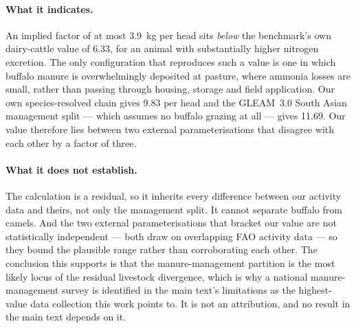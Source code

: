 \paragraph{What it indicates.} An implied factor of at most \SI{3.9}{\kilogram} per head sits
\emph{below} the benchmark's own dairy-cattle value of \SI{6.33}{}, for an animal with substantially
higher nitrogen excretion. The only configuration that reproduces such a value is one in which
buffalo manure is overwhelmingly deposited at pasture, where ammonia losses are small, rather than
passing through housing, storage and field application. Our own species-resolved chain gives
\SI{9.83}{} per head and the GLEAM~3.0 South Asian management split --- which assumes no buffalo
grazing at all --- gives \SI{11.69}{}. Our value therefore lies between two external
parameterisations that disagree with each other by a factor of three.

\paragraph{What it does not establish.} The calculation is a residual, so it inherits every
difference between our activity data and theirs, not only the management split. It cannot separate
buffalo from camels. And the two external parameterisations that bracket our value are not
statistically independent --- both draw on overlapping FAO activity data --- so they bound the
plausible range rather than corroborating each other. The conclusion this supports is that the
manure-management partition is the most likely locus of the residual livestock divergence, which is
why a national manure-management survey is identified in the main text's limitations as the
highest-value data collection this work points to. It is not an attribution, and no result in the
main text depends on it.
